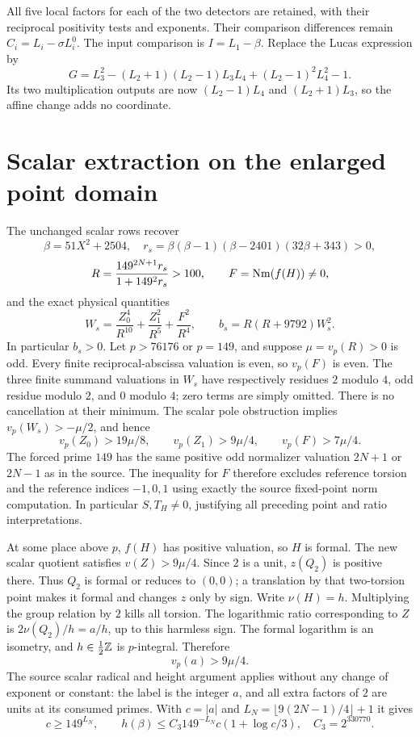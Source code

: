\documentclass[11pt]{article}
\begin{document}
All five local factors for each of the two detectors are retained, with
their reciprocal positivity tests and exponents. Their comparison
differences remain $C_i=L_i-\sigma L_i^0$. The input comparison is
$I=L_1-\beta$. Replace the Lucas expression by
\[
 G=L_3^2-(L_2+1)(L_2-1)L_3L_4+(L_2-1)^2L_4^2-1.
\]
Its two multiplication outputs are now $(L_2-1)L_4$ and
$(L_2+1)L_3$, so the affine change adds no coordinate.

\section*{Scalar extraction on the enlarged point domain}
The unchanged scalar rows recover
\[
 \beta=51X^2+2504,\quad r_s=\beta(\beta-1)(\beta-2401)(32\beta+343)>0,
\]
\[
 R=\frac{149^{2N+1}r_s}{1+149^2r_s}>100,
 \qquad F=\operatorname{Nm}(f(H))\ne0,
\]
and the exact physical quantities
\[
 W_s=\frac{Z_0^4}{R^{10}}+\frac{Z_1^2}{R^5}+\frac{F^2}{R^4},
 \qquad b_s=R(R+9792)W_s^2.
\]
In particular $b_s>0$. Let $p>76176$ or $p=149$, and suppose
$\mu=v_p(R)>0$ is odd. Every finite reciprocal-abscissa valuation is
even, so $v_p(F)$ is even. The three finite summand valuations in $W_s$
have respectively residues $2$ modulo $4$, odd residue modulo $2$,
and $0$ modulo $4$; zero terms are simply omitted. There is no
cancellation at their minimum. The scalar pole obstruction implies
$v_p(W_s)>-\mu/2$, and hence
\[
 v_p(Z_0)>19\mu/8,\qquad v_p(Z_1)>9\mu/4,
 \qquad v_p(F)>7\mu/4.
\]
The forced prime $149$ has the same positive odd normalizer valuation
$2N+1$ or $2N-1$ as in the source. The inequality for $F$ therefore
excludes reference torsion and the reference indices $-1,0,1$ using
exactly the source fixed-point norm computation. In particular
$S,T_H\ne0$, justifying all preceding point and ratio interpretations.

At some place above $p$, $f(H)$ has positive valuation, so $H$ is formal.
The new scalar quotient satisfies $v(Z)>9\mu/4$. Since $2$ is a unit,
$z(Q_2)$ is positive there. Thus $Q_2$ is formal or reduces to $(0,0)$;
a translation by that two-torsion point makes it formal and changes
$z$ only by sign. Write $\nu(H)=h$. Multiplying the group relation by
$2$ kills all torsion. The logarithmic ratio corresponding to $Z$ is
$2\nu(Q_2)/h=a/h$, up to this harmless sign. The formal logarithm is
an isometry, and $h\in\tfrac12\mathbb Z$ is $p$-integral. Therefore
\[
                         v_p(a)>9\mu/4.
\]
The source scalar radical and height argument applies without any
change of exponent or constant: the label is the integer $a$, and all
extra factors of $2$ are units at its consumed primes. With
$c=|a|$ and $L_N=\lfloor9(2N-1)/4\rfloor+1$ it gives
\[
 c\ge149^{L_N},\qquad
 h(\beta)\le C_3 149^{-L_N}c(1+\log c/3),\quad C_3=2^{330770}.
\]
\end{document}
